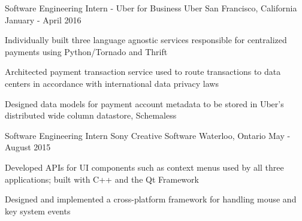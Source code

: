 \begin{cventries}
{\begin{cvitems}
      \end{cvitems}
    }
  \cventry
    {Software Engineering Intern - Uber for Business}
    {Uber}
    {San Francisco, California}
    {January - April 2016}
    {
      \begin{cvitems}
      \item Individually built three language agnostic services responsible for centralized payments using Python/Tornado and Thrift
      \item Architected payment transaction service used to route transactions to data centers in accordance with international data privacy laws
      \item Designed data models for payment account metadata to be stored in Uber's distributed wide column datastore, Schemaless
      \end{cvitems}
    }
  \cventry
    {Software Engineering Intern}
    {Sony Creative Software}
    {Waterloo, Ontario}
    {May - August 2015}
    {
      \begin{cvitems}
        \item Developed APIs for UI components such as context menus used by all three applications; built with C++ and the Qt Framework
        \item Designed and implemented a cross-platform framework for handling mouse and key system events
      \end{cvitems}
    }
\end{cventries}

